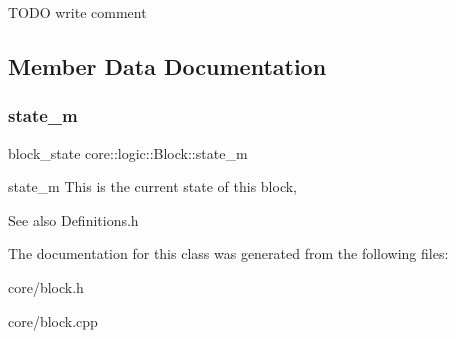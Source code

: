 T\+O\+DO write comment 

\subsection{Member Data Documentation}
\mbox{\label{classcore_1_1logic_1_1_block_ae641fe8a68a54bdfa883c314375e6b6b}} 
\subsubsection{\texorpdfstring{state\+\_\+m}{state\_m}}
{\footnotesize\ttfamily block\+\_\+state core\+::logic\+::\+Block\+::state\+\_\+m\hspace{0.3cm}{\ttfamily [private]}}



state\+\_\+m This is the current state of this block, 

\begin{DoxySeeAlso}{See also}
Definitions.\+h 
\end{DoxySeeAlso}


The documentation for this class was generated from the following files\+:\begin{DoxyCompactItemize}
\item 
core/block.\+h\item 
core/block.\+cpp\end{DoxyCompactItemize}
